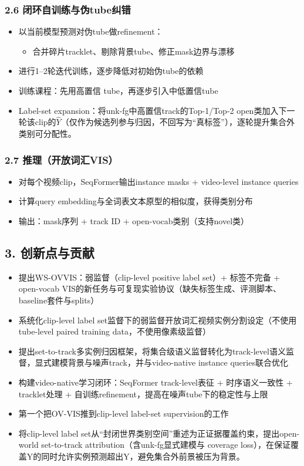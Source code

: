 \documentclass[UTF8]{ctexart}
\begin{document}
\subsubsection*{2.6 闭环自训练与伪tube纠错}
\begin{itemize}
\item 以当前模型预测对伪tube做refinement：
\begin{itemize}
\item 合并碎片tracklet、剔除背景tube、修正mask边界与漂移
\end{itemize}
\item 进行1–2轮迭代训练，逐步降低对初始伪tube的依赖
\item 训练课程：先用高置信 tube，再逐步引入中低置信tube
\item Label-set expansion：将unk-fg中高置信track的Top-1/Top-2 open类加入下一轮该clip的$\hat{Y}$（仅作为候选列参与归因，不回写为“真标签”），逐轮提升集合外类别可分配性。
\end{itemize}

\subsubsection*{2.7 推理（开放词汇VIS）}
\begin{itemize}
\item 对每个视频clip，SeqFormer输出instance masks + video-level instance queries
\item 计算query embedding与全词表文本原型的相似度，获得类别分布
\item 输出：mask序列 + track ID + open-vocab类别（支持novel类）
\end{itemize}

\par\noindent\hrulefill\par


\subsection*{3. 创新点与贡献}
\begin{itemize}
\item 提出WS-OVVIS：弱监督（clip-level positive label set）+ 标签不完备 + open-vocab VIS的新任务与可复现实验协议（缺失标签生成、评测脚本、baseline套件与splits）
\item 系统化clip-level label set监督下的弱监督开放词汇视频实例分割设定（不使用tube-level paired training data，不使用像素级监督）
\item 提出set-to-track多实例归因框架，将集合级语义监督转化为track-level语义监督，显式建模背景与噪声track，并与video-native instance queries联合优化
\item 构建video-native学习闭环：SeqFormer track-level表征 + 时序语义一致性 + tracklet处理 + 自训练refinement，提高在噪声tube下的稳定性与上限
\item 第一个把OV-VIS推到clip-level label-set supervision的工作
\item 将clip-level label set从“封闭世界类别空间”重述为正证据覆盖约束，提出open-world set-to-track attribution（含unk-fg显式建模与 coverage loss），在保证覆盖Y的同时允许实例预测超出Y，避免集合外前景被压为背景。
\end{itemize}
\end{document}
